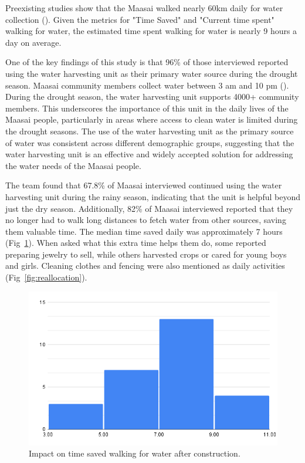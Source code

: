 \documentclass[10pt, twocolumn]{article}
\begin{document}
Preexisting studies show that the Maasai walked nearly 60km daily for water collection (\autocite{choi2014salient}). Given the metrics for "Time Saved" and "Current time spent" walking for water, the estimated time spent walking for water is nearly 9 hours a day on average.

One of the key findings of this study is that 96\% of those interviewed reported using the water harvesting unit as their primary water source during the drought season. Maasai community members collect water between 3 am and 10 pm (\autocite{Google}). During the drought season, the water harvesting unit supports 4000+ community members. This underscores the importance of this unit in the daily lives of the Maasai people, particularly in areas where access to clean water is limited during the drought seasons. The use of the water harvesting unit as the primary source of water was consistent across different demographic groups, suggesting that the water harvesting unit is an effective and widely accepted solution for addressing the water needs of the Maasai people.

The team found that 67.8\% of Maasai interviewed continued using the water harvesting unit during the rainy season, indicating that the unit is helpful beyond just the dry season. Additionally, 82\% of Maasai interviewed reported that they no longer had to walk long distances to fetch water from other sources, saving them valuable time. The median time saved daily was approximately 7 hours (Fig~\ref{fig:time_saved}). When asked what this extra time helps them do, some reported preparing jewelry to sell, while others harvested crops or cared for young boys and girls. Cleaning clothes and fencing were also mentioned as daily activities (Fig~\ref{fig:reallocation}).

\begin{figure}
    \centering
    \includegraphics[width=1\linewidth]{photos/time_saved.png}
    \caption{Impact on time saved walking for water after construction.}
    \label{fig:time_saved}
\end{figure}
\end{document}
